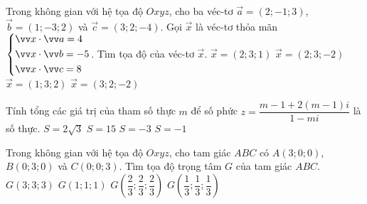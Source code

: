 \begin{ex}%
Trong không gian với hệ tọa độ $Oxyz$, cho ba véc-tơ $\overrightarrow{a}=(2;-1;3)$, $\overrightarrow{b}=(1;-3;2)$ và $\overrightarrow{c}=(3;2;-4)$. Gọi $\overrightarrow{x}$ là véc-tơ thỏa mãn $\heva{&\overrightarrow{x}\cdot\overrightarrow{a}=4\\& \overrightarrow{x}\cdot\overrightarrow{b}=-5\\&\overrightarrow{x}\cdot\overrightarrow{c}=8}$. Tìm tọa độ của véc-tơ $\overrightarrow{x}$.
\choice
{\True $\overrightarrow{x}=(2;3;1)$}
{$\overrightarrow{x}=(2;3;-2)$}
{$\overrightarrow{x}=(1;3;2)$}
{$\overrightarrow{x}=(3;2;-2)$}
\end{ex}

\begin{ex}%
Tính tổng các giá trị của tham số thực $m$ để số phức $z=\dfrac{m-1+2(m-1)i}{1-mi}$ là số thực.
\choice
{$S=2\sqrt{3}$}
{$S=15$}
{$S=-3$}
{\True $S=-1$}
\end{ex}

\begin{ex}%
Trong không gian với hệ tọa độ $Oxyz$, cho tam giác $ABC$ có $A(3;0;0)$, $B(0;3;0)$ và $C(0;0;3)$. Tìm tọa độ trọng tâm $G$ của tam giác $ABC$.
\choice
{$G(3;3;3)$}
{\True $G(1;1;1)$}
{$G\left(\dfrac{2}{3};\dfrac{2}{3};\dfrac{2}{3}\right)$}
{$G\left(\dfrac{1}{3};\dfrac{1}{3};\dfrac{1}{3}\right)$}
\end{ex}

